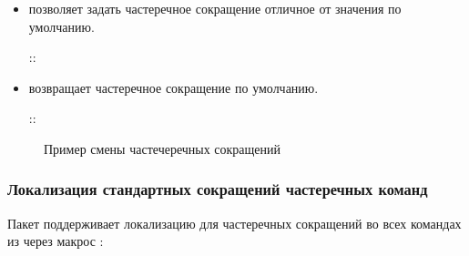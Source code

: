 \begin{itemize}
    \item
          \rsName[rsSetAcr] позволяет задать частеречное сокращение отличное от значения по умолчанию.
          \begin{tcolorbox}
              \rsModifier[cmd]
              {}::
              \rsName[ rsSetAcr ]
              \rsOpt{ \rsArg[язык:tl] }
              \rsReq{ \rsArg[сокращение:tl]  }
          \end{tcolorbox}

    \item
          \rsName[rsResetAcr] возвращает частеречное сокращение по умолчанию.
          \begin{tcolorbox}
              \rsModifier[cmd]
              {}::
              \rsName[ rsResetAcr ]
              \rsOpt{ \rsArg[язык:tl] }
          \end{tcolorbox}
\end{itemize}


\begin{figure}[H]
    \centering
    \begin{minipage}[c]{0.5\textwidth}
        \begin{Latexcode}
        \end{Latexcode}
    \end{minipage}
    \hfill
    \begin{minipage}[c]{0.4\textwidth}
        \small
    \end{minipage}

    \caption{Пример смены частечеречных сокращений}
\end{figure}


\subsubsection{Локализация стандартных сокращений частеречных команд}

Пакет  поддерживает локализацию для частеречных сокращений во всех командах из
 через макрос \rsName[rsSetLanguage]:
\ExplSyntaxOn{}
\begin{tcolorbox}
    \rsCode{
        \rsModifier[cmd]
        {}::
        \rsName[rsSetLanguage]
        \rsReq{ \rsArg[язык: tl] }
    }
\end{tcolorbox}
\ExplSyntaxOff{}


